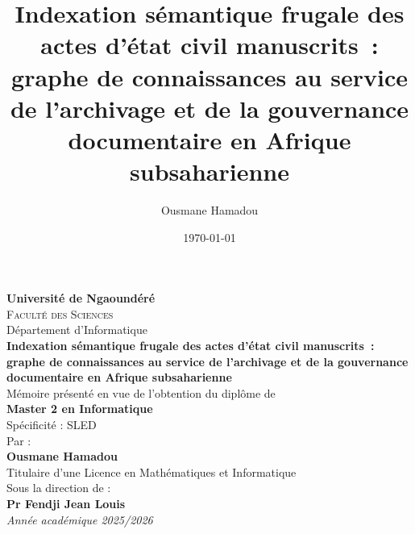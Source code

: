 \documentclass[12pt,a4paper,oneside]{report}
\title{Indexation sémantique frugale des actes d'état civil manuscrits~: graphe de connaissances au service de l'archivage et de la gouvernance documentaire en Afrique subsaharienne}
\author{Ousmane Hamadou}
\date{\today}
\begin{document}


\begin{titlepage}
    \thispagestyle{empty}
    \begin{center}
        {\Large\bfseries Université de Ngaoundéré}\\[0.4cm]
        {\large \textsc{Facult\'e des Sciences}}\\[0.2cm]
        {\normalsize Département d'Informatique}\\[2.5cm]

        {\Large\bfseries Indexation sémantique frugale des actes d'état civil manuscrits~:  graphe de connaissances au service de l'archivage et de la gouvernance documentaire en Afrique subsaharienne}\\[2cm]

        Mémoire présenté en vue de l'obtention du diplôme de\\[0.3cm]
        {\bfseries Master 2 en Informatique}\\[0.3cm]
        Spécificité : SLED\\[2cm]

        Par :\\[0.3cm]
        {\large\bfseries Ousmane Hamadou}\\[0.5cm]  %
        Titulaire d'une Licence en Mathématiques et Informatique\\[2cm]

        Sous la direction de :\\[0.3cm]
        {\bfseries Pr Fendji Jean Louis}\\[2.5cm]

        {\itshape Année académique 2025/2026}
    \end{center}
\end{titlepage}

\setcounter{page}{2}



\clearpage
{} %
\tableofcontents
\listoffigures
\listoftables
\printglossary[type=\acronymtype, title={Liste des acronymes et abréviations}]
\printglossary[title={Glossaire}]




\setcounter{page}{1}







\printbibliography[heading=bibintoc, title={Bibliographie}]

\appendix

\end{document}
